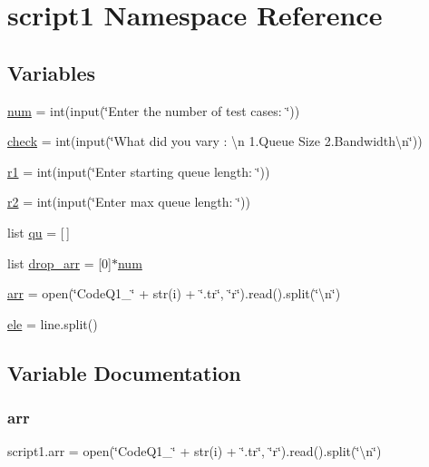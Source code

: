 \hypertarget{namespacescript1}{}\section{script1 Namespace Reference}
\label{namespacescript1}
\subsection*{Variables}
\begin{DoxyCompactItemize}
\item 
\hyperlink{namespacescript1_af3563b114fce201545380250b0275b6b}{num} = int(input(\char`\"{}Enter the number of test cases\+: \char`\"{}))
\item 
\hyperlink{namespacescript1_a912cbac0689717960fafa517297a0711}{check} = int(input(\char`\"{}What did you vary \+: \textbackslash{}n 1.Queue Size 2.Bandwidth\textbackslash{}n\char`\"{}))
\item 
\hyperlink{namespacescript1_a99facd43021956db8051e98b1af4c986}{r1} = int(input(\char`\"{}Enter starting queue length\+: \char`\"{}))
\item 
\hyperlink{namespacescript1_a81541689805d977e0b536a11d038009e}{r2} = int(input(\char`\"{}Enter max queue length\+: \char`\"{}))
\item 
list \hyperlink{namespacescript1_a68ee82d62939b12848148284afe0c215}{qu} = \mbox{[}$\,$\mbox{]}
\item 
list \hyperlink{namespacescript1_aab2ba988c46214b8dce6d1748efe7411}{drop\+\_\+arr} = \mbox{[}0\mbox{]}$\ast$\hyperlink{namespacescript1_af3563b114fce201545380250b0275b6b}{num}
\item 
\hyperlink{namespacescript1_a17abb6a1e3f6622c20f539d9731ea25c}{arr} = open(\char`\"{}Code\+Q1\+\_\+\char`\"{} + str(i) + \char`\"{}.tr\char`\"{}, \char`\"{}r\char`\"{}).read().split(\char`\"{}\textbackslash{}n\char`\"{})
\item 
\hyperlink{namespacescript1_aecd146a4e9abc4438d8826460a90d182}{ele} = line.\+split()
\end{DoxyCompactItemize}


\subsection{Variable Documentation}
\mbox{\label{namespacescript1_a17abb6a1e3f6622c20f539d9731ea25c}} 
\subsubsection{\texorpdfstring{arr}{arr}}
{\footnotesize\ttfamily script1.\+arr = open(\char`\"{}Code\+Q1\+\_\+\char`\"{} + str(i) + \char`\"{}.tr\char`\"{}, \char`\"{}r\char`\"{}).read().split(\char`\"{}\textbackslash{}n\char`\"{})}

